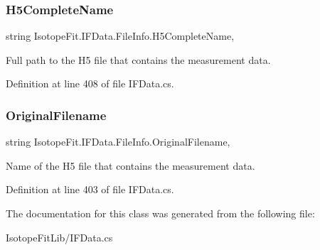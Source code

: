 \subsubsection{\texorpdfstring{H5\+Complete\+Name}{H5CompleteName}}
{\footnotesize\ttfamily string Isotope\+Fit.\+I\+F\+Data.\+File\+Info.\+H5\+Complete\+Name\hspace{0.3cm}{\ttfamily [get]}, {\ttfamily [set]}}



Full path to the H5 file that contains the measurement data. 



Definition at line 408 of file I\+F\+Data.\+cs.

\mbox{\label{class_isotope_fit_1_1_i_f_data_1_1_file_info_a465af980a8c2f2a971d213e328b5932c}} 
\subsubsection{\texorpdfstring{Original\+Filename}{OriginalFilename}}
{\footnotesize\ttfamily string Isotope\+Fit.\+I\+F\+Data.\+File\+Info.\+Original\+Filename\hspace{0.3cm}{\ttfamily [get]}, {\ttfamily [set]}}



Name of the H5 file that contains the measurement data. 



Definition at line 403 of file I\+F\+Data.\+cs.



The documentation for this class was generated from the following file\+:\begin{DoxyCompactItemize}
\item 
Isotope\+Fit\+Lib/I\+F\+Data.\+cs\end{DoxyCompactItemize}
